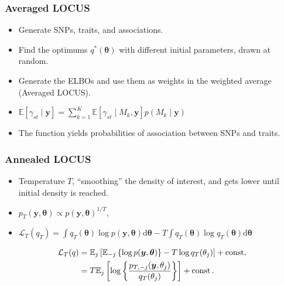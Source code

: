 \documentclass{beamer}
\DeclareMathOperator*{\const}{{\rm const}}
\begin{document}
\begin{frame}
\frametitle{Averaged LOCUS}
\begin{itemize}
\item Generate SNPs, traits, and associations.
\item Find the optimums $q^*(\boldsymbol{\theta})$ with different initial parameters, drawn at random.
\item Generate the ELBOs and use them as weights in the weighted average (Averaged LOCUS).
\item $\mathbb{E}\left[\gamma_{st}\mid \boldsymbol{y}\right]= \sum_{k=1}^K \mathbb{E}\left[\gamma_{st}\mid M_k,\boldsymbol{y}\right]p(M_k\mid\boldsymbol{y})$
\item The function yields probabilities of association between SNPs and traits.
\end{itemize}
\end{frame}

\begin{frame}
\frametitle{Annealed LOCUS}
\begin{itemize}
\item Temperature $T$, ``smoothing'' the density of interest, and gets lower until initial density is reached.
\item $p_T(\boldsymbol{y},\boldsymbol{\theta}) \propto p(\boldsymbol{y},\boldsymbol{\theta})^{1/T}$,
\item $\mathcal{L}_T(q_T) = \int q_T(\boldsymbol{\theta}) \log p(\boldsymbol{y},\boldsymbol{\theta})\mathrm{d}\boldsymbol{\theta} - T \int q_T(\boldsymbol{\theta}) \log q_T(\boldsymbol{\theta}) \mathrm{d}\boldsymbol{\theta}$

\end{itemize}
\begin{align*}
\mathcal{L}_T(q) &= \mathbb{E}_j\left[\mathbb{E}_{-j}\left\lbrace \log p(\boldsymbol{y},\boldsymbol{\theta})\right\rbrace - T \log q_T(\theta_j)\right]+ \const,\\
&= T\mathbb{E}_j\left[\log\left\lbrace\frac{p_{T, -j}(\boldsymbol{y}, \theta_j)}{q_T(\theta_j)}\right\rbrace\right] + \const.
\end{align*}

\end{frame}
\end{document}
